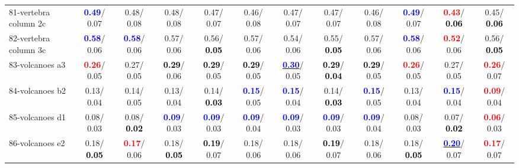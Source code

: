 \begin{table}[h]
\begin{center}
{\begin{tabular}{lc|c|c|c|c|c|c|c|c|c|c}
81-vertebra column 2c & \textcolor{blue}{\textbf{  0.49}}/  0.07 &   0.48/  0.08 &   0.48/  0.08 &   0.47/  0.07 &   0.46/  0.08 &   0.47/  0.07 &   0.47/  0.07 &   0.46/  0.08 & \textcolor{blue}{\textbf{  0.49}}/  0.07 & \textcolor{red}{\textbf{  0.43}}/\textcolor{black}{\textbf{  0.06}} &   0.45/\textcolor{black}{\textbf{  0.06}} \\
82-vertebra column 3c & \textcolor{blue}{\textbf{  0.58}}/  0.06 & \textcolor{blue}{\textbf{  0.58}}/  0.06 &   0.57/  0.06 &   0.56/\textcolor{black}{\textbf{  0.05}} &   0.57/  0.06 &   0.54/  0.06 &   0.55/\textcolor{black}{\textbf{  0.05}} &   0.57/  0.06 & \textcolor{blue}{\textbf{  0.58}}/  0.06 & \textcolor{red}{\textbf{  0.52}}/  0.06 &   0.56/\textcolor{black}{\textbf{  0.05}} \\
83-volcanoes a3 & \textcolor{red}{\textbf{  0.26}}/  0.05 &   0.27/  0.05 & \textcolor{black}{\textbf{  0.29}}/  0.06 & \textcolor{black}{\textbf{  0.29}}/  0.05 & \textcolor{black}{\textbf{  0.29}}/  0.05 & \underline{\textcolor{blue}{\textbf{  0.30}}}/  0.05 & \textcolor{black}{\textbf{  0.29}}/\textcolor{black}{\textbf{  0.04}} & \textcolor{black}{\textbf{  0.29}}/  0.05 & \textcolor{red}{\textbf{  0.26}}/  0.05 &   0.27/  0.05 & \textcolor{red}{\textbf{  0.26}}/  0.07 \\
84-volcanoes b2 &   0.13/  0.04 &   0.14/  0.05 &   0.13/  0.04 &   0.14/\textcolor{black}{\textbf{  0.03}} & \textcolor{blue}{\textbf{  0.15}}/  0.05 & \textcolor{blue}{\textbf{  0.15}}/  0.04 &   0.14/\textcolor{black}{\textbf{  0.03}} & \textcolor{blue}{\textbf{  0.15}}/  0.05 &   0.13/  0.04 & \textcolor{blue}{\textbf{  0.15}}/  0.04 & \textcolor{red}{\textbf{  0.09}}/  0.04 \\
85-volcanoes d1 &   0.08/  0.03 &   0.08/\textcolor{black}{\textbf{  0.02}} & \textcolor{blue}{\textbf{  0.09}}/  0.03 & \textcolor{blue}{\textbf{  0.09}}/  0.03 & \textcolor{blue}{\textbf{  0.09}}/  0.04 & \textcolor{blue}{\textbf{  0.09}}/  0.03 & \textcolor{blue}{\textbf{  0.09}}/  0.03 & \textcolor{blue}{\textbf{  0.09}}/  0.04 &   0.08/  0.03 &   0.07/\textcolor{black}{\textbf{  0.02}} & \textcolor{red}{\textbf{  0.06}}/  0.03 \\ \hline
86-volcanoes e2 &   0.18/\textcolor{black}{\textbf{  0.05}} & \textcolor{red}{\textbf{  0.17}}/  0.06 &   0.18/\textcolor{black}{\textbf{  0.05}} & \textcolor{black}{\textbf{  0.19}}/  0.07 &   0.18/  0.06 &   0.18/  0.06 & \textcolor{black}{\textbf{  0.19}}/  0.07 &   0.18/  0.06 &   0.18/\textcolor{black}{\textbf{  0.05}} & \underline{\textcolor{blue}{\textbf{  0.20}}}/  0.07 & \textcolor{red}{\textbf{  0.17}}/  0.07 \\

\end{tabular}}
\end{center}
\end{table}
